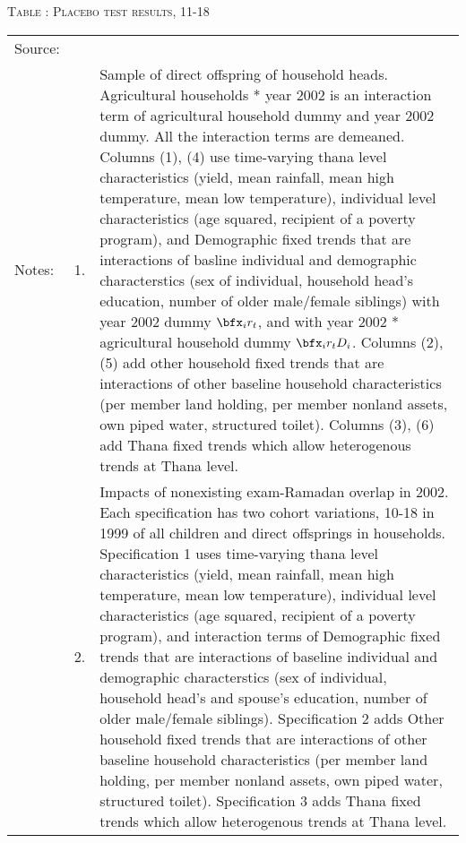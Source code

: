 \begin{table}
\hfil\textsc{\footnotesize Table \thetable: Placebo test results, 11-18\label{PlaceboResults11Table}}\\
\setlength{\tabcolsep}{1pt}
\renewcommand{\arraystretch}{.55}
\hfil

\renewcommand{\arraystretch}{1}
\hfil\begin{tabular}{>{\hfill\scriptsize}p{1cm}<{}>{\hfill\scriptsize}p{.5cm}<{}>{\scriptsize}p{12cm}<{\hfill}}
Source:& \multicolumn{2}{l}{\scriptsize Compiled from IFPRI data. }\\[-1ex]
Notes:& 1. & Sample of direct offspring of household heads. \textsf{Agricultural households * year 2002} is an interaction term of agricultural household dummy and year 2002 dummy. All the interaction terms are demeaned. Columns \textsf{(1), (4)} use time-varying thana level characteristics (yield, mean rainfall, mean high temperature, mean low temperature), individual level characteristics (age squared, recipient of a poverty program), and \textsf{Demographic fixed trends} that are interactions of basline individual and demographic characterstics (sex of individual, household head's education, number of older male/female siblings) with year 2002 dummy $\bfx_{i}r_{t}$, and with year 2002 * agricultural household dummy $\bfx_{i}r_{t}D_{i}$. Columns \textsf{(2), (5)} add \textsf{other household fixed trends} that are interactions of other baseline household characteristics (per member land holding, per member nonland assets, own piped water, structured toilet). Columns \textsf{(3), (6)} add \textsf{Thana fixed trends} which allow heterogenous trends at Thana level. \\[-1ex]
& 2. & Impacts of nonexisting exam-Ramadan overlap in 2002. Each specification has two cohort variations, \textsf{10-18 in 1999} of all children and direct offsprings in households. \textsf{Specification 1} uses time-varying thana level characteristics (yield, mean rainfall, mean high temperature, mean low temperature), individual level characteristics (age squared, recipient of a poverty program), and interaction terms of \textsf{Demographic fixed trends} that are interactions of baseline individual and demographic characterstics (sex of individual, household head's and spouse's education, number of older male/female siblings). \textsf{Specification 2} adds \textsf{Other household fixed trends} that are interactions of other baseline household characteristics (per member land holding, per member nonland assets, own piped water, structured toilet). \textsf{Specification 3} adds \textsf{Thana fixed trends} which allow heterogenous trends at Thana level. \\[-1ex]

\end{tabular}
\end{table}
